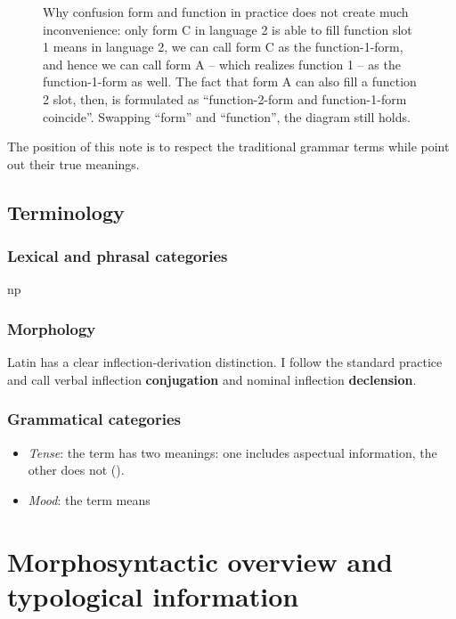 \documentclass{article}
\newcommand*{\concept}[1]{\textbf{#1}}
\begin{document}
\begin{figure}
    \centering
    
    \caption{Why confusion form and function in practice does not create much inconvenience:
    only form C in language 2 is able to fill function slot 1 means in language 2,
    we can call form C as the function-1-form,
    and hence we can call form A -- which realizes function 1 -- as the function-1-form as well.
    The fact that form A can also fill a function 2 slot, then,
    is formulated as ``function-2-form and function-1-form coincide''.
    Swapping ``form'' and ``function'', the diagram still holds.}
    \label{fig:form-function}
\end{figure}

The position of this note is to respect the traditional grammar terms
while point out their true meanings.

\subsection{Terminology}

\subsubsection{Lexical and phrasal categories}

\ac{np}

\subsubsection{Morphology}

Latin has a clear inflection-derivation distinction.
I follow the standard practice and call verbal inflection \concept{conjugation} 
and nominal inflection \concept{declension}.

\subsubsection{Grammatical categories}

\begin{itemize}
    \item \emph{Tense}: the term has two meanings: one includes aspectual information,
    the other does not (). 
    \item \emph{Mood}: the term means 
\end{itemize}

\section{Morphosyntactic overview and typological information}
\end{document}
